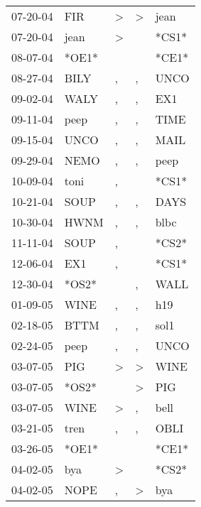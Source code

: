\begin{supertabular}{lllll}
 07-20-04 &    FIR &     \textgreater &     \textgreater &   jean \\
 07-20-04 &   jean &     \textgreater &                  &  *CS1* \\
 08-07-04 &  *OE1* &                  &                  &  *CE1* \\
 08-27-04 &   BILY &                , &                , &   UNCO \\
 09-02-04 &   WALY &                , &                , &    EX1 \\
 09-11-04 &   peep &                , &                , &   TIME \\
 09-15-04 &   UNCO &                , &                , &   MAIL \\
 09-29-04 &   NEMO &                , &                , &   peep \\
 10-09-04 &   toni &                , &                  &  *CS1* \\
 10-21-04 &   SOUP &                , &                , &   DAYS \\
 10-30-04 &   HWNM &                , &                , &   blbc \\
 11-11-04 &   SOUP &                , &                  &  *CS2* \\
 12-06-04 &    EX1 &                , &                  &  *CS1* \\
 12-30-04 &  *OS2* &                  &                , &   WALL \\
 01-09-05 &   WINE &                , &                , &    h19 \\
 02-18-05 &   BTTM &                , &                , &   sol1 \\
 02-24-05 &   peep &                , &                , &   UNCO \\
 03-07-05 &    PIG &     \textgreater &     \textgreater &   WINE \\
 03-07-05 &  *OS2* &                  &     \textgreater &    PIG \\
 03-07-05 &   WINE &     \textgreater &                , &   bell \\
 03-21-05 &   tren &                , &                , &   OBLI \\
 03-26-05 &  *OE1* &                  &                  &  *CE1* \\
 04-02-05 &    bya &     \textgreater &                  &  *CS2* \\
 04-02-05 &   NOPE &                , &     \textgreater &    bya \\

\end{supertabular}
